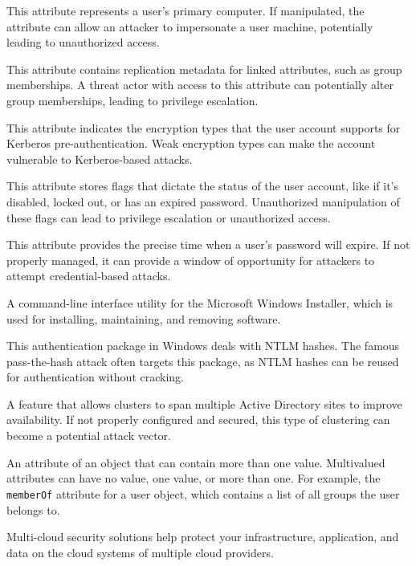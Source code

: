  This attribute represents a user’s primary computer. If manipulated, the attribute can allow an attacker to impersonate a user machine, potentially leading to unauthorized access.

 This attribute contains replication metadata for linked attributes, such as group memberships. A threat actor with access to this attribute can potentially alter group memberships, leading to privilege escalation.

This attribute indicates the encryption types that the user account supports for Kerberos pre-authentication. Weak encryption types can make the account vulnerable to Kerberos-based attacks.

 This attribute stores flags that dictate the status of the user account, like if it’s disabled, locked out, or has an expired password. Unauthorized manipulation of these flags can lead to privilege escalation or unauthorized access.

 This attribute provides the precise time when a user’s password will expire. If not properly managed, it can provide a window of opportunity for attackers to attempt credential-based attacks.

 A command-line interface utility for the Microsoft Windows Installer, which is used for installing, maintaining, and removing software.

 This authentication package in Windows deals with NTLM hashes. The famous pass-the-hash attack often targets this package, as NTLM hashes can be reused for authentication without cracking.

 A feature that allows clusters to span multiple Active Directory sites to improve availability. If not properly configured and secured, this type of clustering can become a potential attack vector.

 An attribute of an object that can contain more than one value. Multivalued attributes can have no value, one value, or more than one. For example, the \texttt{memberOf} attribute for a user object, which contains a list of all groups the user belongs to.

 Multi-cloud security solutions help protect your infrastructure, application, and data on the cloud systems of multiple cloud providers.

